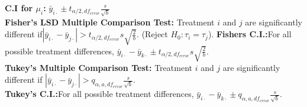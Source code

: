 \documentclass[10pt]{article}
\begin{document}
  \textbf{C.I for $\mu_i$:} $\bar{y}_{i \cdot} \pm t_{\alpha/2, df_{error}} \frac{s}{\sqrt{b}}$ \\
  \textbf{Fisher's LSD Multiple Comparison Test:} Treatment $i$ and $j$ are significantly different if$\left| \bar{y}_{i \cdot} - \bar{y}_{j \cdot} \right| > t_{\alpha/2, df_{error}} s \sqrt{\frac{2}{b}}$. (Reject $H_0: \tau_i = \tau_j$).
  \textbf{Fishers C.I.:}For all possible treatment differences, $\bar{y}_{i \cdot} - \bar{y}_{k \cdot} \pm t_{\alpha/2, df_{error}} s \sqrt{\frac{2}{b}}$. \\
  \textbf{Tukey's Multiple Comparison Test:} Treatment $i$ and $j$ are significantly different if $\left| \bar{y}_{i \cdot} - \bar{y}_{j \cdot} \right| > q_{\alpha, a, df_{error}} \frac{s}{\sqrt{b}}$.\\
  \textbf{Tukey's C.I.:}For all possible treatment differences, $\bar{y}_{i \cdot} - \bar{y}_{k \cdot} \pm q_{\alpha, a, df_{error}} \frac{s}{\sqrt{b}}$.
  
\end{document}
